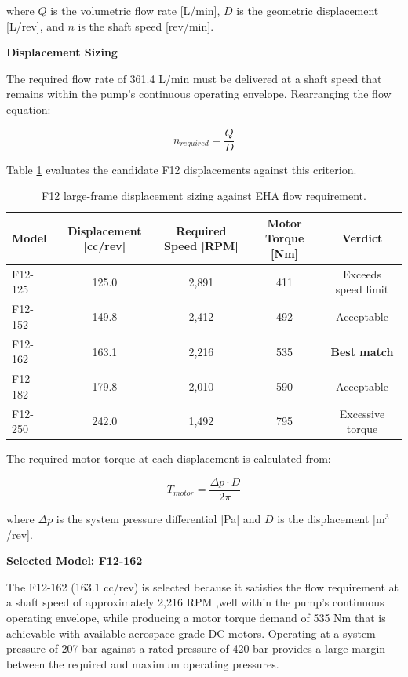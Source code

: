 \documentclass[
bindingoffset=5mm,  %
footnoteindent=3mm, %
hyphenation=true    %
]{src/wut-thesis}
\begin{document}
	where $Q$ is the volumetric flow rate [L/min], $D$ is the geometric displacement [L/rev], and $n$ is the shaft speed [rev/min].
	
	\textbf{Displacement Sizing}
	
	The required flow rate of 361.4 L/min must be delivered at a shaft speed that remains within the pump's continuous operating envelope. Rearranging the flow equation:
	
	\begin{equation}
		n_{required} = \frac{Q}{D}
	\end{equation}
	
	Table \ref{table:pump_sizing} evaluates the candidate F12 displacements against this criterion.
	
	\begin{table}[htbp]
		\centering
		\begin{tabular}{l c c c c}
			\toprule
			Model & Displacement [cc/rev] & Required Speed [RPM] & Motor Torque [Nm] & Verdict \\
			\midrule
			F12-125 & 125.0 & 2{,}891 & 411 & Exceeds speed limit \\
			F12-152 & 149.8 & 2{,}412 & 492 & Acceptable \\
			F12-162 & 163.1 & 2{,}216 & 535 & \textbf{Best match} \\
			F12-182 & 179.8 & 2{,}010 & 590 & Acceptable \\
			F12-250 & 242.0 & 1{,}492 & 795 & Excessive torque \\
			\bottomrule
		\end{tabular}
		\caption{F12 large-frame displacement sizing against EHA flow requirement.\cite{parker_f11_f12}}
		\label{table:pump_sizing}
	\end{table}
	
	The required motor torque at each displacement is calculated from:
	
	\begin{equation}
		T_{motor} = \frac{\Delta p \cdot D}{2\pi}
	\end{equation}
	
	where $\Delta p$ is the system pressure differential [Pa] and $D$ is the displacement [m$^3$/rev].
	
	\textbf{Selected Model: F12-162}
	
	The F12-162 (163.1 cc/rev) is selected because it satisfies the flow requirement at a shaft speed of approximately 2,216 RPM ,well within the pump's continuous operating envelope, while producing a motor torque demand of 535 Nm that is achievable with available aerospace grade DC motors. Operating at a system pressure of 207 bar against a rated pressure of 420 bar provides a large margin between the required and maximum operating pressures.
	
\end{document}
